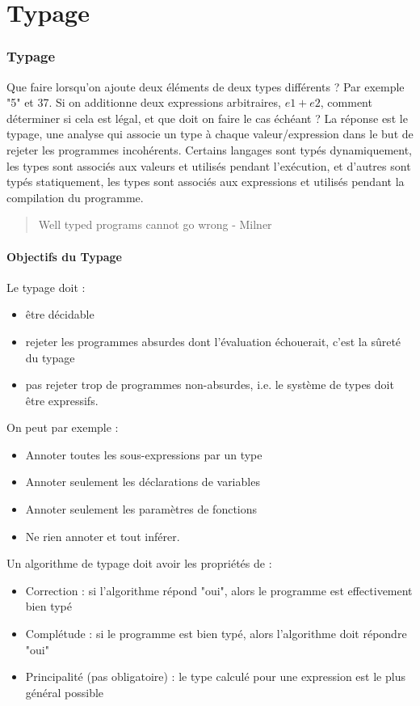 \documentclass{cours}
\begin{document}
\newpage
\part{Typage}
\localtableofcontents
\section{Typage}
Que faire lorsqu'on ajoute deux éléments de deux types différents ? Par exemple "5" et 37.
Si on additionne deux expressions arbitraires, $e1 + e2$, comment déterminer si cela est légal, et que doit on faire le cas échéant ? La réponse est le typage, une analyse qui associe un type à chaque valeur/expression dans le but de rejeter les programmes incohérents.
Certains langages sont typés dynamiquement, les types sont associés aux valeurs et utilisés pendant l'exécution, et d'autres sont typés statiquement, les types sont associés aux expressions et utilisés pendant la compilation du programme.

\begin{quotation}
    Well typed programs cannot go wrong - Milner
\end{quotation}

\subsection{Objectifs du Typage}
Le typage doit  :
\begin{itemize}
    \item être décidable
    \item rejeter les programmes absurdes dont l'évaluation échouerait, c'est la sûreté du typage
    \item pas rejeter trop de programmes non-absurdes, i.e. le système de types doit être expressifs.
\end{itemize}

On peut par exemple :
\begin{itemize}
    \item Annoter toutes les sous-expressions par un type
    \item Annoter seulement les déclarations de variables
    \item Annoter seulement les paramètres de fonctions
    \item Ne rien annoter et tout inférer.
\end{itemize}

Un algorithme de typage doit avoir les propriétés de :
\begin{itemize}
    \item Correction : si l'algorithme répond "oui", alors le programme est effectivement bien typé
    \item Complétude : si le programme est bien typé, alors l'algorithme doit répondre "oui"
    \item Principalité (pas obligatoire) : le type calculé pour une expression est le plus général possible
\end{itemize}
\end{document}
